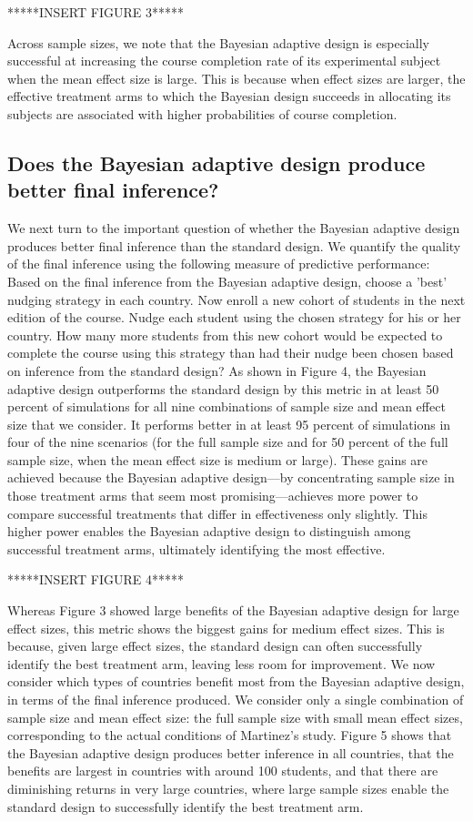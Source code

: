 \documentclass{acm_proc_article-sp}
\begin{document}
*****INSERT FIGURE 3*****

Across sample sizes, we note that the Bayesian adaptive design is especially successful at increasing the course completion rate of its experimental subject when the mean effect size is large. This is because when effect sizes are larger, the effective treatment arms to which the Bayesian design succeeds in allocating its subjects are associated with higher probabilities of course completion. 

\subsection{Does the Bayesian adaptive design produce better final inference?}
We next turn to the important question of whether the Bayesian adaptive design produces better final inference than the standard design. We quantify the quality of the final inference using the following measure of predictive performance: Based on the final inference from the Bayesian adaptive design, choose a 'best' nudging strategy in each country. Now enroll a new cohort of students in the next edition of the course. Nudge each student using the chosen strategy for his or her country. How many more students from this new cohort would be expected to complete the course using this strategy than had their nudge been chosen based on inference from the standard design? 
As shown in Figure 4, the Bayesian adaptive design outperforms the standard design by this metric in at least 50 percent of simulations for all nine combinations of sample size and mean effect size that we consider. It performs better in at least 95 percent of simulations in four of the nine scenarios (for the full sample size and for 50 percent of the full sample size, when the mean effect size is medium or large). These gains are achieved because the Bayesian adaptive design—by concentrating sample size in those treatment arms that seem most promising—achieves more power to compare successful treatments that differ in effectiveness only slightly. This higher power enables the Bayesian adaptive design to distinguish among successful treatment arms, ultimately identifying the most effective. 

*****INSERT FIGURE 4*****

Whereas Figure 3 showed large benefits of the Bayesian adaptive design for large effect sizes, this metric shows the biggest gains for medium effect sizes. This is because, given large effect sizes, the standard design can often successfully identify the best treatment arm, leaving less room for improvement. 
We now consider which types of countries benefit most from the Bayesian adaptive design, in terms of the final inference produced. We consider only a single combination of sample size and mean effect size: the full sample size with small mean effect sizes, corresponding to the actual conditions of Martinez’s study. Figure 5 shows that the Bayesian adaptive design produces better inference in all countries, that the benefits are largest in countries with around 100 students, and that there are diminishing returns in very large countries, where large sample sizes enable the standard design to successfully identify the best treatment arm. 
\end{document}

